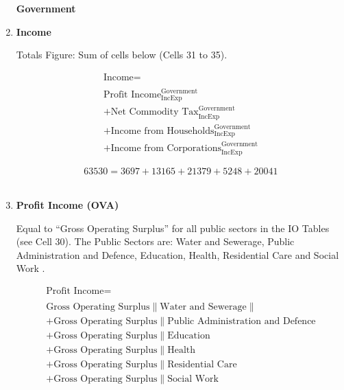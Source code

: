 \begin{enumerate}
\begin{center}
\textbf{\LARGE Government}
\end{center}

\item \textbf {Income}

Totals Figure: Sum of cells below (Cells 31 to 35).

\begin{equation}
\begin{split}
\text{Income} =  \\ \\
\text{Profit Income}^\text{Government}_\text{IncExp}\\
+\text{Net Commodity Tax}^\text{Government}_\text{IncExp}\\
+\text{Income from Households}^\text{Government}_\text{IncExp}\\
+\text{Income from Corporations}^\text{Government}_\text{IncExp}
\end{split} \label{eq:2.5.34}
\end{equation}

\begin{equation} \nonumber
63530 = 3697+13165+21379+5248+20041
\end{equation}\\


\item \textbf {Profit Income (OVA)}

Equal to ``Gross Operating Surplus'' for all public sectors in the IO Tables (see Cell 30). The Public Sectors are: Water and Sewerage, Public Administration and Defence, Education, Health, Residential Care and Social Work \cite{ScotGov2013a}.

\begin{equation}
\begin{split}
\text{Profit Income} =  \\ \\
\text{Gross Operating Surplus}\|\text{Water and Sewerage}\|\\
+\text{Gross Operating Surplus}\|\text{Public Administration and Defence}\\
+\text{Gross Operating Surplus}\|\text{Education}\\
+\text{Gross Operating Surplus}\|\text{Health}\\
+\text{Gross Operating Surplus}\|\text{Residential Care}\\
+\text{Gross Operating Surplus}\|\text{Social Work}\\
\end{split} \label{eq:2.5.35}
\end{equation}


\end{enumerate}
